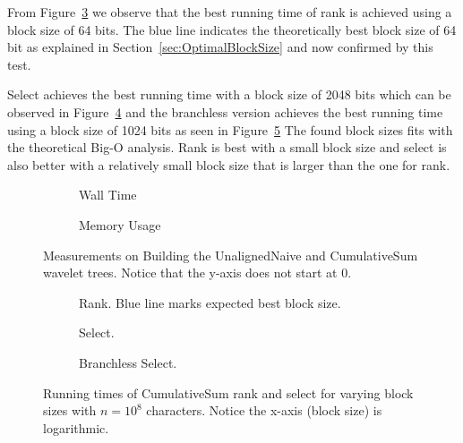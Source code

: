 From Figure~\ref{fig:CumulativeSumBlockSizeWallTimeRank} we observe that the best running time of rank is achieved using a block size of 64 bits.
The blue line indicates the theoretically best block size of 64 bit as explained in Section~\ref{sec:OptimalBlockSize} and now confirmed by this test.

Select achieves the best running time with a block size of 2048 bits which can be observed in Figure~\ref{fig:CumulativeSumBlockSizeWallTimeSelect} and the branchless version achieves the best running time using a block size of 1024 bits as seen in Figure~\ref{fig:CumulativeSumBlockSizeWallTimeSelectBranchless}
The found block sizes fits with the theoretical Big-O analysis.
Rank is best with a small block size and select is also better with a relatively small block size that is larger than the one for rank.


\begin{figure}\tiny
\begin{subfigure}{0.48\textwidth}
	
	\caption{Wall Time}
	\label{fig:CumulativeSumBuildWalltime}
\end{subfigure}
\hfill
\begin{subfigure}{0.48\textwidth}
	
	\caption{Memory Usage}
	\label{fig:CumulativeSumBuildMemoryUsage}
\end{subfigure}
\caption{Measurements on Building the UnalignedNaive and CumulativeSum wavelet trees. Notice that the y-axis does not start at 0.}
\label{fig:CumulativeSumBuild}
\vspace{5mm}
\begin{subfigure}{0.48\textwidth}
	
	\caption{Rank. Blue line marks expected best block size.}
	\label{fig:CumulativeSumBlockSizeWallTimeRank}
\end{subfigure}
\hfill
\begin{subfigure}{0.48\textwidth}
	
	\caption{Select.}
	\label{fig:CumulativeSumBlockSizeWallTimeSelect}
\end{subfigure}

\begin{subfigure}{0.48\textwidth}
	
	\caption{Branchless Select.}
	\label{fig:CumulativeSumBlockSizeWallTimeSelectBranchless}
\end{subfigure}

\caption{Running times of CumulativeSum rank and select for varying block sizes with $n=10^8$ characters. Notice the x-axis (block size) is logarithmic.}
\label{fig:CumulativeSumBlockSize}
\end{figure}

